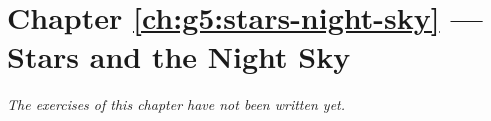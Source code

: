 \section*{Chapter \ref{ch:g5:stars-night-sky} --- Stars and the Night Sky}


\emph{The exercises of this chapter have not been written yet.}
